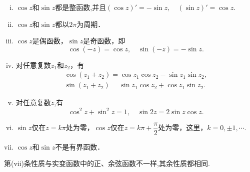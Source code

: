 \documentclass[../../main.tex]{subfiles}
\begin{document}
\begin{proposition}[三角函数的性质]\label{proposition:三角函数的性质}
\begin{enumerate}[(i)]
\item $\cos z$和$\sin z$都是整函数,并且$(\cos z)' = -\sin z,
\quad
(\sin z)' = \cos z.$

\item $\cos z$和$\sin z$都以$2\pi$为周期．

\item $\cos z$是偶函数，$\sin z$是奇函数，即
\[
\cos(-z) = \cos z,
\quad
\sin(-z) = -\sin z.
\]

\item 对任意复数$z_1$和$z_2$，有
\begin{align}
\cos(z_1 + z_2) = \cos z_1 \cos z_2 - \sin z_1 \sin z_2, \label{equation----2.2.2.2.1}
\\
\sin(z_1 + z_2) = \sin z_1 \cos z_2 + \cos z_1 \sin z_2.
\label{equation----2.2.2.2.2} 
\end{align}

\item 对任意复数$z$,有
\[
\cos^2 z + \sin^2 z = 1,
\quad
\sin 2z = 2\sin z \cos z.
\]

\item $\sin z$仅在$z = k\pi$处为零，$\cos z$仅在$z = k\pi + \dfrac{\pi}{2}$处为零，这里，$k = 0, \pm 1, \cdots$.

\item $\cos z$和$\sin z$不是有界函数．
\end{enumerate}
\end{proposition}
\begin{remark}
第(vii)条性质与实变函数中的正、余弦函数不一样,其余性质都相同.
\end{remark}
\end{document}
